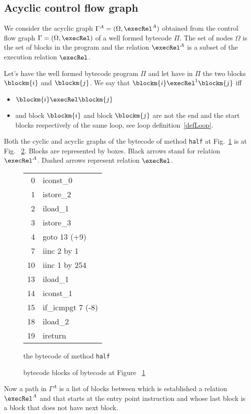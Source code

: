 \subsection{Acyclic control flow graph} \label{graph}
We consider the acyclic graph $\Gamma^A = ( \Omega, \execRel^A)$ obtained from the control flow graph 
$\Gamma  = ( \Omega, \execRel)$ of a well formed bytecode $ \Pi $. The set of nodes $\Omega$ is the set of  blocks in the 
program and the relation  $\execRel^A$ is a subset of the  execution relation $\execRel$.
\begin{defn}
\label{acyclicExRel}
Let's have the well formed bytecode program $\Pi$ and let have in $\Pi$ the two blocks  $\blockm{i} $ and   $\blockm{j}$. We say 
that $\blockm{i} \execRel^{1} \blockm{j}$ iff
\begin{itemize}
\item $\blockm{i} \execRel \blockm{j}$
\item and block $\blockm{i}$ and block $\blockm{j}$ are not the end and the start blocks respectively of the same loop, see loop definition~\ref{defLoop}.
\end{itemize}
\end{defn}

Both the cyclic and acyclic graphs of the bytecode of method \texttt{half} at Fig.~\ref{halfBC} is at Fig. ~\ref{blockBC}. Blocks are represented by boxes. Black arrows stand for relation $\execRel^A$. Dashed arrows represent relation $\execRel$.

\begin{figure}[p]
\begin{center}
\begin{tabular}{rl}
 0 & iconst\_0\\ 
 1 & istore\_2\\
 2 & iload\_1\\
 3 & istore\_3\\%
 4 & goto 13 (+9)\\%
 7 & iinc 2 by 1\\%
10 & iinc 1 by 254\\%
13 & iload\_1\\%
14 & iconst\_1\\%
15 & if\_icmpgt 7 (-8)\\%
18 & iload\_2\\%
19 & ireturn\\%
\end{tabular}
\end{center}
\caption{the bytecode of method \texttt{half}}
\label{halfBC}
\end{figure}

\begin{figure}[p]
\begin{center}
\end{center}
\caption{bytecode blocks of bytecode at Figure ~\ref{halfBC}}
\label{blockBC}
\end{figure}

Now a path in $\Gamma^A$  is a list of blocks between which is established a relation $\execRel^A$ and that starts at the entry point instruction and whose last block is a block that does not have next block.

